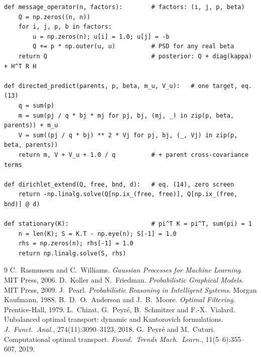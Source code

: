 \documentclass[11pt]{article}
\begin{document}
\begin{lstlisting}[caption={The three cores (verified against
\texttt{volfit.graph}; agreements stated above).}]
def message_operator(n, factors):        # factors: (i, j, p, beta)
    Q = np.zeros((n, n))
    for i, j, p, b in factors:
        u = np.zeros(n); u[i] = 1.0; u[j] = -b
        Q += p * np.outer(u, u)          # PSD for any real beta
    return Q                             # posterior: Q + diag(kappa) + H^T R H

def directed_predict(parents, p, beta, m_u, V_u):   # one target, eq. (13)
    q = sum(p)
    m = sum(pj / q * bj * mj for pj, bj, (mj, _) in zip(p, beta, parents)) + m_u
    V = sum((pj / q * bj) ** 2 * Vj for pj, bj, (_, Vj) in zip(p, beta, parents))
    return m, V + V_u + 1.0 / q          # + parent cross-covariance terms

def dirichlet_extend(Q, free, bnd, d):   # eq. (14), zero screen
    return -np.linalg.solve(Q[np.ix_(free, free)], Q[np.ix_(free, bnd)] @ d)

def stationary(K):                       # pi^T K = pi^T, sum(pi) = 1
    n = len(K); S = K.T - np.eye(n); S[-1] = 1.0
    rhs = np.zeros(n); rhs[-1] = 1.0
    return np.linalg.solve(S, rhs)
\end{lstlisting}

\begin{thebibliography}{9}
 C.~Rasmussen and C.~Williams.
\emph{Gaussian Processes for Machine Learning}. MIT Press, 2006.
 D.~Koller and N.~Friedman. \emph{Probabilistic
Graphical Models}. MIT Press, 2009.
 J.~Pearl. \emph{Probabilistic Reasoning in
Intelligent Systems}. Morgan Kaufmann, 1988.
 B.~D.~O.~Anderson and J.~B.~Moore.
\emph{Optimal Filtering}. Prentice-Hall, 1979.
 L.~Chizat, G.~Peyr\'e, B.~Schmitzer and
F.-X.~Vialard. Unbalanced optimal transport: dynamic and Kantorovich
formulations. \emph{J.\ Funct.\ Anal.}, 274(11):3090--3123, 2018.
 G.~Peyr\'e and M.~Cuturi. Computational optimal
transport. \emph{Found.\ Trends Mach.\ Learn.}, 11(5--6):355--607,
2019.
\end{thebibliography}
\end{document}
